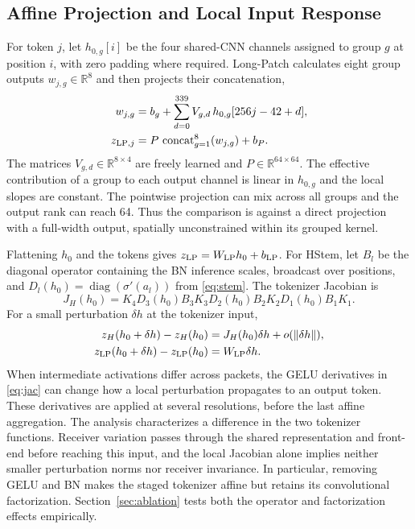 \documentclass[journal]{IEEEtran}
\begin{document}
\subsection{Affine Projection and Local Input Response}
For token \(j\), let \(h_{0,g}[i]\) be the four shared-CNN channels assigned to group \(g\) at position \(i\), with zero padding where required. Long-Patch calculates eight group outputs \(w_{j,g}\in\mathbb R^8\) and then projects their concatenation,
\begin{align}
 w_{j,g}&=b_g+\sum_{d=0}^{339} V_{g,d}\,h_{0,g}[256j-42+d],\\
 z_{{\rm LP},j}&=P\,\operatorname{concat}_{g=1}^{8}(w_{j,g})+b_P .
\end{align}
The matrices \(V_{g,d}\in\mathbb R^{8\times4}\) are freely learned and \(P\in\mathbb R^{64\times64}\). The effective contribution of a group to each output channel is linear in \(h_{0,g}\) and the local slopes are constant. The pointwise projection can mix across all groups and the output rank can reach 64. Thus the comparison is against a direct projection with a full-width output, spatially unconstrained within its grouped kernel.

Flattening \(h_0\) and the tokens gives \(z_{\rm LP}=W_{\rm LP}h_0+b_{\rm LP}\). For HStem, let \(B_l\) be the diagonal operator containing the BN inference scales, broadcast over positions, and \(D_l(h_0)=\operatorname{diag}(\sigma'(a_l))\) from \eqref{eq:stem}. The tokenizer Jacobian is
\begin{equation}
 J_H(h_0)=K_4D_3(h_0)B_3K_3D_2(h_0)B_2K_2D_1(h_0)B_1K_1.
 \label{eq:jac}
\end{equation}
For a small perturbation \(\delta h\) at the tokenizer input,
\begin{align}
 z_H(h_0+\delta h)-z_H(h_0)&=J_H(h_0)\delta h
                  +o(\|\delta h\|),\\
 z_{\rm LP}(h_0+\delta h)-z_{\rm LP}(h_0)&=W_{\rm LP}\delta h .
\end{align}
When intermediate activations differ across packets, the GELU derivatives in \eqref{eq:jac} can change how a local perturbation propagates to an output token. These derivatives are applied at several resolutions, before the last affine aggregation. The analysis characterizes a difference in the two tokenizer functions. Receiver variation passes through the shared representation and front-end before reaching this input, and the local Jacobian alone implies neither smaller perturbation norms nor receiver invariance. In particular, removing GELU and BN makes the staged tokenizer affine but retains its convolutional factorization. Section~\ref{sec:ablation} tests both the operator and factorization effects empirically.
\end{document}
